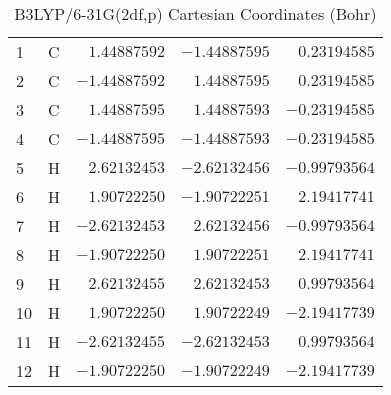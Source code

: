 \documentclass[10pt,oneside]{article}
\begin{document}
\begin{table}[h]
\centering
\caption{B3LYP/6-31G(2df,p) Cartesian Coordinates (Bohr)}
\begin{tabular}{llrrr}
\toprule
1  & C  & $ 1.44887592$ & $-1.44887595$ & $ 0.23194585$ \\
2  & C  & $-1.44887592$ & $ 1.44887595$ & $ 0.23194585$ \\
3  & C  & $ 1.44887595$ & $ 1.44887593$ & $-0.23194585$ \\
4  & C  & $-1.44887595$ & $-1.44887593$ & $-0.23194585$ \\
5  & H  & $ 2.62132453$ & $-2.62132456$ & $-0.99793564$ \\
6  & H  & $ 1.90722250$ & $-1.90722251$ & $ 2.19417741$ \\
7  & H  & $-2.62132453$ & $ 2.62132456$ & $-0.99793564$ \\
8  & H  & $-1.90722250$ & $ 1.90722251$ & $ 2.19417741$ \\
9  & H  & $ 2.62132455$ & $ 2.62132453$ & $ 0.99793564$ \\
10 & H  & $ 1.90722250$ & $ 1.90722249$ & $-2.19417739$ \\
11 & H  & $-2.62132455$ & $-2.62132453$ & $ 0.99793564$ \\
12 & H  & $-1.90722250$ & $-1.90722249$ & $-2.19417739$ \\
\bottomrule
\end{tabular}
\end{table}
\end{document}
